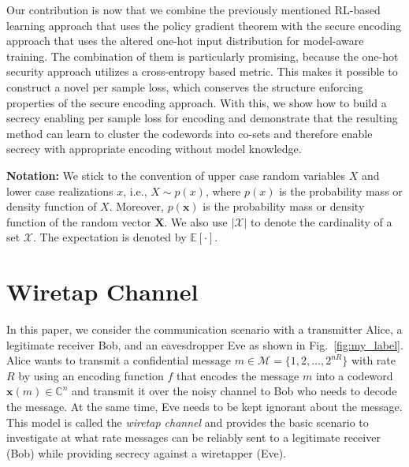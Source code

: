 \documentclass[conference, 10pt]{IEEEtran}
\begin{document}
Our contribution is now that we combine the previously mentioned RL-based learning approach that uses the policy gradient theorem with the secure encoding approach that uses the altered one-hot input distribution for model-aware training. The combination of them is particularly promising, because the one-hot security approach utilizes a cross-entropy based metric. This makes it possible to construct a novel per sample loss, which conserves the structure enforcing properties of the secure encoding approach. With this, we show how to build a secrecy enabling per sample loss for encoding and demonstrate that the resulting method can learn to cluster the codewords into co-sets and therefore enable secrecy with appropriate encoding without model knowledge.

{\bf Notation:} We stick to the convention of upper case random variables $X$ and lower case realizations $x$, i.e., $X\sim p(x)$, where $p(x)$ is the probability mass or density function of $X$. Moreover, $p(\mathbf{x})$ is the probability mass or density function of the random vector $\mathbf{X}$. We also use $|\mathcal{X}|$ to denote the cardinality of a set $\mathcal{X}$. The expectation is denoted by $\mathbb{E}[\cdot]$.






\section{Wiretap Channel}
\label{InfoThModel}




In this paper, we consider the communication scenario with a transmitter Alice, a legitimate receiver Bob, and an eavesdropper Eve as shown in Fig.~\ref{fig:my_label}. Alice wants to transmit a confidential message $m\!\in\! \mathcal{M}\!=\!\{1,2, \ldots, 2^{nR}\}$ with rate $R$ by using an encoding function $f$ that encodes the message $m$ into a codeword $\mathbf{x}(m)\in\mathbb{C}^n$ and transmit it over the noisy channel to Bob who needs to decode the message. At the same time, Eve needs to be kept ignorant about the message. This model is called the \emph{wiretap channel} and provides the basic scenario to investigate at what rate messages can be reliably sent to a legitimate receiver (Bob) while providing secrecy against a wiretapper (Eve).
\end{document}
